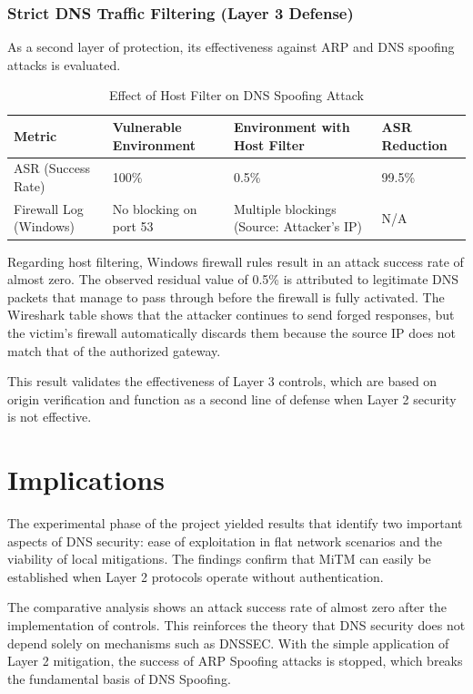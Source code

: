 \documentclass[conference]{IEEEtran}
\begin{document}
\subsubsection{Strict DNS Traffic Filtering (Layer 3 Defense)}
As a second layer of protection, its effectiveness against ARP and DNS spoofing attacks is evaluated.
\begin{table}[htbp]
\caption{Effect of Host Filter on DNS Spoofing Attack}
\label{tab:hostfilter}
\begin {center}
\begin{tabular}{@{}p{1.5cm} p{1.5cm} p{3cm} p{1.5cm}@{}} \hline
\textbf{Metric} & \textbf{Vulnerable Environment} & \textbf{Environment with Host Filter} & \textbf{ASR Reduction} \\ \hline
ASR (Success Rate) & 100\% & 0.5\% & 99.5\% \\
Firewall Log (Windows) & No blocking on port 53 & Multiple blockings (Source: Attacker's IP) & N/A \\
\hline
\end{tabular}
\end{center}
\end{table}

Regarding host filtering, Windows firewall rules result in an attack success rate of almost zero. The observed residual value of 0.5\% is attributed to legitimate DNS packets that manage to pass through before the firewall is fully activated. The Wireshark table shows that the attacker continues to send forged responses, but the victim's firewall automatically discards them because the source IP does not match that of the authorized gateway.

This result validates the effectiveness of Layer 3 controls, which are based on origin verification and function as a second line of defense when Layer 2 security is not effective.




\section{Implications}
The experimental phase of the project yielded results that identify two important aspects of DNS security: ease of exploitation in flat network scenarios and the viability of local mitigations. The findings confirm that MiTM can easily be established when Layer 2 protocols operate without authentication.

The comparative analysis shows an attack success rate of almost zero after the implementation of controls. This reinforces the theory that DNS security does not depend solely on mechanisms such as DNSSEC. With the simple application of Layer 2 mitigation, the success of ARP Spoofing attacks is stopped, which breaks the fundamental basis of DNS Spoofing.
\end{document}
